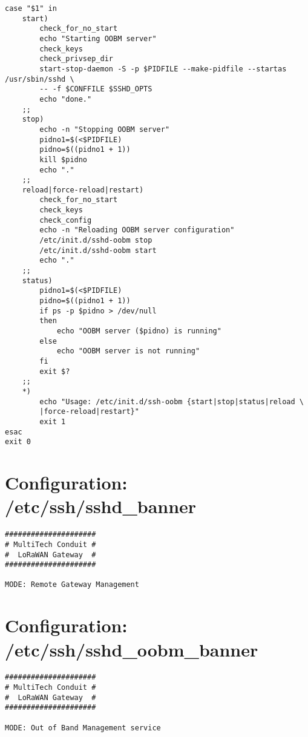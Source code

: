 \begin{verbatim}
case "$1" in
    start)
        check_for_no_start
        echo "Starting OOBM server"
        check_keys
        check_privsep_dir
        start-stop-daemon -S -p $PIDFILE --make-pidfile --startas /usr/sbin/sshd \
        -- -f $CONFFILE $SSHD_OPTS
        echo "done."
    ;;
    stop)
        echo -n "Stopping OOBM server"
        pidno1=$(<$PIDFILE)
        pidno=$((pidno1 + 1))
        kill $pidno
        echo "."
    ;;
    reload|force-reload|restart)
        check_for_no_start
        check_keys
        check_config
        echo -n "Reloading OOBM server configuration"
        /etc/init.d/sshd-oobm stop
        /etc/init.d/sshd-oobm start
        echo "."
    ;;
    status)
        pidno1=$(<$PIDFILE)
        pidno=$((pidno1 + 1))
        if ps -p $pidno > /dev/null
        then
            echo "OOBM server ($pidno) is running"
        else
            echo "OOBM server is not running"
        fi
        exit $?
    ;;
    *)
        echo "Usage: /etc/init.d/ssh-oobm {start|stop|status|reload \
        |force-reload|restart}"
        exit 1
esac
exit 0
\end{verbatim}

\section{Configuration: /etc/ssh/sshd\_banner}
\label{section:appendix-ssh-sshdbanner}
\begin{verbatim}
#####################
# MultiTech Conduit #
#  LoRaWAN Gateway  #
#####################

MODE: Remote Gateway Management
\end{verbatim}

\section{Configuration: /etc/ssh/sshd\_oobm\_banner}
\label{section:appendix-ssh-sshdoodbmbanner}
\begin{verbatim}
#####################
# MultiTech Conduit #
#  LoRaWAN Gateway  #
#####################

MODE: Out of Band Management service
\end{verbatim}

